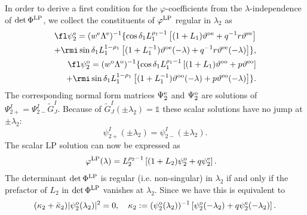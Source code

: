 \documentclass[12pt]{iopart}
\begin{document}
In order to derive a first condition for the $\varphi$-coefficients from the $\lambda$-independence of $\det\Phi^{\rm LP}$, we collect the constituents of $\varphi^{\rm LP}$ regular in $\lambda_2$ as
\begin{eqnarray}
\fl\psi_2^{\rm e}=(w^{\rm e}\Lambda^{\rm e})^{-1} \lbrace\cos\delta_1 L_1^{\rho_1-1}\left[(1+L_1)\vartheta^{\rm oe}+q^{-1}r\vartheta^{\rm ee}\right]  \nonumber\\
+\rmi\sin\delta_1 L_1^{1-\rho_1}\left[(1+L_1^{-1})\vartheta^{\rm oe}(-\lambda)+q^{-1}r\vartheta^{\rm ee}(-\lambda)\right]\rbrace , 
 \\
\fl\psi_2^{\rm o}=(w^{\rm o}\Lambda^{\rm o})^{-1} \lbrace\cos\delta_1 L_1^{\rho_1-1}\left[(1+L_1)\vartheta^{\rm oo}+p\vartheta^{\rm eo}\right] \nonumber\\
+\rmi\sin\delta_1 L_1^{1-\rho_1}\left[(1+L_1^{-1})\vartheta^{\rm oo}(-\lambda)+p\vartheta^{\rm eo}(-\lambda)\right]\rbrace . 
\end{eqnarray}
The corresponding normal form matrices $\Psi_2^{\rm e}$ and $\Psi_2^{\rm o}$ are solutions of $\Psi_{2+}^I=\Psi_{2-}^I\tilde{G}_J^I$. Because of $\tilde{G}_J^I(\pm\lambda_2)=\mathbb{1}$ these scalar solutions have no jump at $\pm\lambda_2$:
\begin{equation}
\psi_{2+}^{I}(\pm\lambda_2)=\psi_{2-}^{I}(\pm\lambda_2). \label{psi2NoJump}
\end{equation}
The scalar LP solution can now be expressed as  
\begin{eqnarray}
\varphi^{\rm LP}(\lambda)&=L_2^{\rho_2-1}\left[(1+L_2)\psi_2^{\rm o}+q\psi_2^{\rm e}\right]. \label{psiugDarst}
\end{eqnarray}
The determinant $\det\Phi^{\rm LP}$ is regular (i.e. non-singular) in $\lambda_2$ if and only if the prefactor of $L_2$ in $\det\Phi^{\rm LP}$ vanishes at $\lambda_2$. Since we have  this is equivalent to 
\begin{equation} \label{kappa2}
(\kappa_2+\bar{\kappa}_2)|\psi_{2}^{\rm o}(\lambda_2)|^2=0, \quad \kappa_2:=(\psi_2^{\rm o}(\lambda_2))^{-1} \left[\psi_2^{\rm o}(-\lambda_2)+q\psi_2^{\rm e}(-\lambda_2)\right].
\end{equation}
\end{document}
